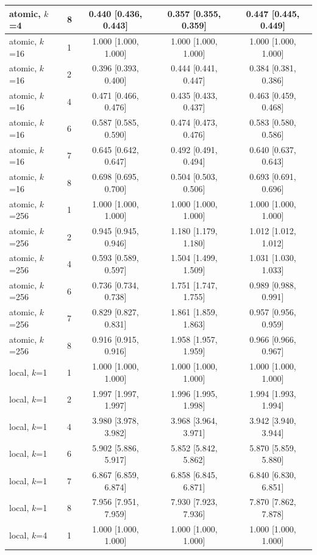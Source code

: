 {\begin{longtable}{llccc}
atomic, $k$=4 & 8 & 0.440 [0.436, 0.443] & 0.357 [0.355, 0.359] & 0.447 [0.445, 0.449] \\
\midrule
atomic, $k$=16 & 1 & 1.000 [1.000, 1.000] & 1.000 [1.000, 1.000] & 1.000 [1.000, 1.000] \\
atomic, $k$=16 & 2 & 0.396 [0.393, 0.400] & 0.444 [0.441, 0.447] & 0.384 [0.381, 0.386] \\
atomic, $k$=16 & 4 & 0.471 [0.466, 0.476] & 0.435 [0.433, 0.437] & 0.463 [0.459, 0.468] \\
atomic, $k$=16 & 6 & 0.587 [0.585, 0.590] & 0.474 [0.473, 0.476] & 0.583 [0.580, 0.586] \\
atomic, $k$=16 & 7 & 0.645 [0.642, 0.647] & 0.492 [0.491, 0.494] & 0.640 [0.637, 0.643] \\
atomic, $k$=16 & 8 & 0.698 [0.695, 0.700] & 0.504 [0.503, 0.506] & 0.693 [0.691, 0.696] \\
\midrule
atomic, $k$=256 & 1 & 1.000 [1.000, 1.000] & 1.000 [1.000, 1.000] & 1.000 [1.000, 1.000] \\
atomic, $k$=256 & 2 & 0.945 [0.945, 0.946] & 1.180 [1.179, 1.180] & 1.012 [1.012, 1.012] \\
atomic, $k$=256 & 4 & 0.593 [0.589, 0.597] & 1.504 [1.499, 1.509] & 1.031 [1.030, 1.033] \\
atomic, $k$=256 & 6 & 0.736 [0.734, 0.738] & 1.751 [1.747, 1.755] & 0.989 [0.988, 0.991] \\
atomic, $k$=256 & 7 & 0.829 [0.827, 0.831] & 1.861 [1.859, 1.863] & 0.957 [0.956, 0.959] \\
atomic, $k$=256 & 8 & 0.916 [0.915, 0.916] & 1.958 [1.957, 1.959] & 0.966 [0.966, 0.967] \\
\midrule
local, $k$=1 & 1 & 1.000 [1.000, 1.000] & 1.000 [1.000, 1.000] & 1.000 [1.000, 1.000] \\
local, $k$=1 & 2 & 1.997 [1.997, 1.997] & 1.996 [1.995, 1.998] & 1.994 [1.993, 1.994] \\
local, $k$=1 & 4 & 3.980 [3.978, 3.982] & 3.968 [3.964, 3.971] & 3.942 [3.940, 3.944] \\
local, $k$=1 & 6 & 5.902 [5.886, 5.917] & 5.852 [5.842, 5.862] & 5.870 [5.859, 5.880] \\
local, $k$=1 & 7 & 6.867 [6.859, 6.874] & 6.858 [6.845, 6.871] & 6.840 [6.830, 6.851] \\
local, $k$=1 & 8 & 7.956 [7.951, 7.959] & 7.930 [7.923, 7.936] & 7.870 [7.862, 7.878] \\
\midrule
local, $k$=4 & 1 & 1.000 [1.000, 1.000] & 1.000 [1.000, 1.000] & 1.000 [1.000, 1.000] \\

\end{longtable}}
